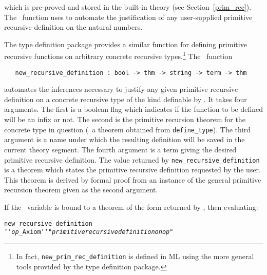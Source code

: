 \noindent which is pre-proved and stored in the built-in theory 
(see Section~\ref{prim_rec}).  The \ML\ function
 uses  to automate the
justification of any user-supplied primitive recursive definition on the
natural numbers.

The type definition package provides a similar function for defining
primitive recursive functions on
arbitrary concrete recursive
types.\footnote{In fact, {\tt new\_prim\_rec\_definition} is defined in ML
using the more general tools provided by the type definition package.}
The \ML\ function

\begin{boxed}
\begin{verbatim}
   new_recursive_definition : bool -> thm -> string -> term -> thm
\end{verbatim}\end{boxed}

\noindent automates the
inferences necessary to justify any given primitive recursive definition on a
concrete recursive type of the kind definable by .
 It takes four arguments.  The first is a boolean
flag which indicates if the function to be defined will be an infix or not.
The second is the primitive recursion theorem for the concrete type in question
(\ie\ a theorem obtained from {\small\verb!define_type!}).  The third
argument is a name under which the resulting definition will be saved in the
current theory segment.
The fourth argument is a term giving the desired primitive recursive
definition.  The value returned
by  {\small\verb!new_recursive_definition!} is a theorem
which states the primitive recursive definition requested by the
user.  This theorem is derived by formal proof from an instance of the general
primitive recursion theorem
 given as the second argument.

If the \ML\ variable  is bound to a theorem of the form
returned by ,
then evaluating:

{\def\op{{\normalsize\sl op}}
\begin{hol}\begin{alltt}
   new_recursive_definition
     `` \op\_Axiom `` "{\normalsize\it primitive recursive definition on \op}"
\end{alltt}\end{hol}}

